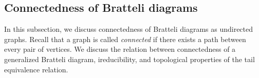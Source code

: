 \documentclass[11pt, twoside]{amsart}
\theoremstyle{definition}
\theoremstyle{remark}
\theoremstyle{plain}
\newcommand{\tcr}{\textcolor{red}}
\numberwithin{equation}{section}
\begin{document}



    

    
     
    
   
    
    
  




\subsection{Connectedness of Bratteli diagrams}
In this subsection, we discuss connectedness of Bratteli diagrams as undirected graphs. Recall that a graph is called \textit{connected} if there exists a path between every pair of vertices. We discuss the relation between connectedness of a generalized Bratteli diagram, ireducibility, and topological properties of the tail equivalence relation.


\end{document}
